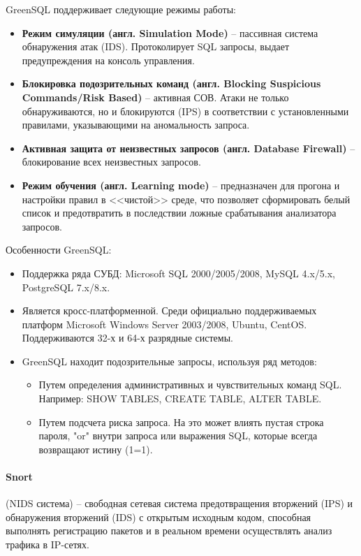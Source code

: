 GreenSQL поддерживает следующие режимы работы:
\begin{itemize}
	\item \textbf{Режим симуляции (англ. Simulation Mode)} -- пассивная система обнаружения
	атак (IDS). Протоколирует SQL запросы, выдает предупреждения на консоль управления.

	\item \textbf{Блокировка подозрительных команд (англ. Blocking Suspicious Commands/Risk Based)} --
	активная СОВ. Атаки не только обнаруживаются, но и блокируются (IPS) в соответствии с
	установленными правилами, указывающими на аномальность запроса.

	\item \textbf{Активная защита от неизвестных запросов (англ. Database Firewall)} --
	блокирование всех неизвестных запросов.

	\item \textbf{Режим обучения (англ. Learning mode)} -- предназначен для прогона и
	настройки правил в <<чистой>> среде, что позволяет сформировать белый список и
	предотвратить в последствии ложные срабатывания анализатора запросов.
\end{itemize}

Особенности GreenSQL:
\begin{itemize}
	\item Поддержка ряда СУБД: Microsoft SQL 2000/2005/2008, MySQL 4.x/5.x, PostgreSQL 7.x/8.x.

	\item Является кросс-платформенной. Среди официально поддерживаемых платформ Microsoft
	Windows Server 2003/2008, Ubuntu, CentOS. Поддерживаются 32-х и 64-х разрядные системы.

	\item GreenSQL находит подозрительные запросы, используя ряд методов:
	\begin{itemize}
		\item Путем определения административных и чувствительных команд SQL.
		Например: SHOW TABLES, CREATE TABLE, ALTER TABLE.

		\item Путем подсчета риска запроса. На это может влиять пустая строка пароля, "or"
		внутри запроса или выражения SQL, которые всегда возвращают истину (1=1).
	\end{itemize}

\end{itemize}


\paragraph*{Snort} (NIDS система) -- свободная сетевая система предотвращения вторжений (IPS)
и обнаружения вторжений (IDS) с открытым исходным кодом, способная выполнять регистрацию
пакетов и в реальном времени осуществлять анализ трафика в IP-сетях.

